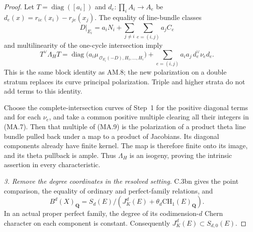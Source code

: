\begin{proof}
Let $T=\operatorname{diag}([a_i])$ and
$d_e:\prod_iA_i\to A_e$ be
$d_e(x)=r_{ie}(x_i)-r_{je}(x_j)$.
The equality of line-bundle classes
\[
 D|_{E_i}=a_iN_i+
             \sum_{j\ne i}\sum_{e=(i,j)}a_jC_e
\]
and multilinearity of the one-cycle intersection imply
\begin{equation}
 T^\vee\Lambda_HT
 =\operatorname{diag}
    \bigl(a_i\mu_{\,\mathcal O_{E_i}(-D),H_i,\ldots,H_i}\bigr)
       +\sum_{e=(i,j)}a_i a_j\,d_e^\vee\nu_ed_e.
                                                        \tag{MA.9}
\end{equation}
This is the same block identity as AM.8; the new polarization
on a double stratum replaces its curve principal polarization.
Triple and higher strata do not add terms to this identity.

Choose the complete-intersection curves of Step~1 for the
positive diagonal terms and for each $\nu_e$, and take a common
positive multiple clearing all their integers in (MA.7).
Then that multiple of (MA.9) is the polarization of a product
theta line bundle pulled back under a map to a product of
Jacobians. Its diagonal components already have finite kernel.
The map is therefore finite onto its image, and its theta
pullback is ample. Thus $\Lambda_H$ is an isogeny, proving
the intrinsic assertion in every characteristic.

\emph{3. Remove the degree coordinates in the resolved setting.}
C.3bn gives the point comparison, the equality of ordinary and
perfect-family relations, and
\begin{equation}
 B^d(X)_{\mathbf Q}
 =S_d(E)/(J_K^d(E)+\theta_d\mathrm{CH}_1(E)_{\mathbf Q}).
                                                        \tag{MA.10}
\end{equation}
In an actual proper perfect family, the degree of its
codimension-$d$ Chern character on each component is constant.
Consequently $J_K^d(E)\subset S_{d,0}(E)$.


\end{proof}
